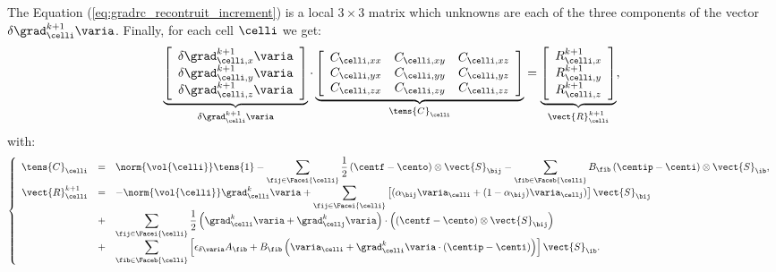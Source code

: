 The Equation (\ref{eq:gradrc_recontruit_increment}) is a local $3 \times 3$ matrix which unknowns are each of the three components of
the vector $\delta \grad_{\celli}^{k+1} \varia$. Finally, for each cell $\celli$ we get:
%
\begin{equation}\label{eq:eq_systeme_matriciel_gradrc}
\underbrace{
\left[\begin{array}{c}
\delta \grad_{\celli ,x}^{k+1} \varia\\
\delta \grad_{\celli ,y}^{k+1} \varia\\
\delta \grad_{\celli ,z}^{k+1} \varia
\end{array}\right]
}_{\delta \grad_{\celli}^{k+1} \varia }
\cdot
\underbrace{
\left[\begin{array}{ccc}
\displaystyle
  C_{\celli , xx}
& C_{\celli , xy}
& C_{\celli , xz}\\
\displaystyle
  C_{\celli , yx}
& C_{\celli , yy}
& C_{\celli , yz}\\
\displaystyle
  C_{\celli , zx}
& C_{\celli , zy}
& C_{\celli , zz}
\end{array}\right]
}_{\tens{C}_{\celli}}
=
\underbrace{
\left[\begin{array}{c}
\displaystyle
R^{k+1}_{\celli ,x}\\
\displaystyle
R^{k+1}_{\celli ,y}\\
\displaystyle
R^{k+1}_{\celli ,z}
\end{array}\right]
}_{\vect{R}^{k+1}_{\celli}} ,
\end{equation}
%
with:
%
\begin{equation}\label{eq:eq_second_membre_gradrc}
\left\{\begin{array}{rcl}
\tens{C}_\celli  &=&
\displaystyle
\norm{\vol{\celli}} \tens{1} -
\sum\limits_{ \fij \in \Facei{\celli}} \frac{1}{2}  \left(\centf - \cento\right) \otimes \vect{S}_{\bij} -
\sum\limits_{ \fib \in \Faceb{\celli}} B_{\fib} \left(\centip - \centi\right)  \otimes \vect{S}_{\ib} ,\\
\vect{R}^{k+1}_{\celli} &=&
\displaystyle
 -\norm{\vol{\celli}}  \grad_{\celli}^{k} \varia +
\sum\limits_{\fij \in \Facei{\celli}}\left[
(\alpha_{\bij} \varia_\celli + (1 - \alpha_{\bij}) \varia_{\cellj})\right] \vect{S}_{\bij} \\
&+& \displaystyle
\sum\limits_{\fij \in \Facei{\celli}} \frac{1}{2}
\left(\grad_\celli^k \varia + \grad_{\cellj}^k \varia \right) \cdot \left( \left(\centf - \cento\right) \otimes \vect{S}_{\bij} \right) \\
&+& \displaystyle
\sum\limits_{\fib \in \Faceb{\celli}}\left[ \epsilon_{\delta \varia} A_{\fib}
+ B_{\fib} \left( \varia_{\celli} + \grad_{\celli}^k \varia \cdot \left(\centip - \centi\right) \right)  \right] \vect{S}_{\ib} .
\end{array}\right.
\end{equation}

